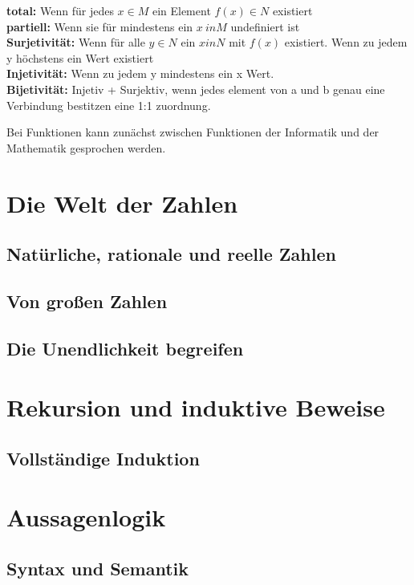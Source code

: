 \textbf{total:} Wenn für jedes $x \in M $ ein Element $f(x) \in N$ existiert\\
\textbf{partiell:} Wenn sie für mindestens ein $x \ in M$ undefiniert ist\\

\textbf{Surjetivität:} Wenn für alle $y \in N$ ein $x in N$ mit $f(x)$ existiert. Wenn zu jedem y höchstens ein Wert existiert\\

\textbf{Injetivität:} Wenn zu jedem y mindestens ein x Wert.\\

\textbf{Bijetivität:} Injetiv + Surjektiv, wenn jedes element von a und b genau eine Verbindung bestitzen eine 1:1 zuordnung.


Bei Funktionen kann zunächst zwischen Funktionen der Informatik und der Mathematik gesprochen werden. 




\section{Die Welt der Zahlen}
\subsection{Natürliche, rationale und reelle Zahlen}
\subsection{Von großen Zahlen}
\subsection{Die Unendlichkeit begreifen}

\section{Rekursion und induktive Beweise}
\subsection{Vollständige Induktion}

\section{Aussagenlogik}
\subsection{Syntax und Semantik}
